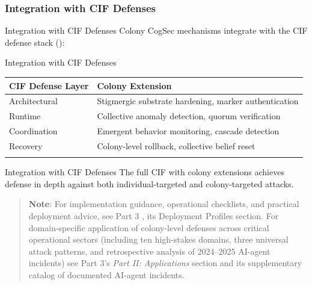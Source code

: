 \documentclass[
  ignorenonframetext,
]{beamer}
\newcounter{none} %
\providecommand{\cref}[1]{\texttt{\detokenize{#1}}}
\begin{document}
\subsubsection{Integration with CIF Defenses}\label{sec:cif-integration}

\begin{frame}[allowframebreaks]{Integration with CIF Defenses}
Colony CogSec mechanisms integrate with the CIF defense stack
(\cref{sec:defense-mechanisms}):

\end{frame}

\begin{frame}[allowframebreaks]{Integration with CIF Defenses}
{\def\LTcaptype{none} %
\begin{longtable}[]{@{}
  >{\raggedright\arraybackslash}p{}
  >{\raggedright\arraybackslash}p{}@{}}
\toprule\noalign{}
\begin{minipage}[b]{\linewidth}\raggedright
CIF Defense Layer
\end{minipage} & \begin{minipage}[b]{\linewidth}\raggedright
Colony Extension
\end{minipage} \\
\midrule\noalign{}
\endhead
Architectural & Stigmergic substrate hardening, marker authentication \\
Runtime & Collective anomaly detection, quorum verification \\
Coordination & Emergent behavior monitoring, cascade detection \\
Recovery & Colony-level rollback, collective belief reset \\
\bottomrule\noalign{}
\end{longtable}
}

\end{frame}

\begin{frame}[allowframebreaks]{Integration with CIF Defenses}
The full CIF with colony extensions achieves defense in depth against
both individual-targeted and colony-targeted attacks.

\begin{quote}
\textbf{Note}: For implementation guidance, operational checklists, and
practical deployment advice, see Part 3 \cite{friedman2026cogsec3}, its
Deployment Profiles section. For domain-specific application of
colony-level defenses across critical operational sectors (including ten
high-stakes domains, three universal attack patterns, and retrospective
analysis of 2024--2025 AI-agent incidents) see Part 3's \emph{Part II:
Applications} section and its supplementary catalog of documented
AI-agent incidents.
\end{quote}
\end{frame}
\end{document}
